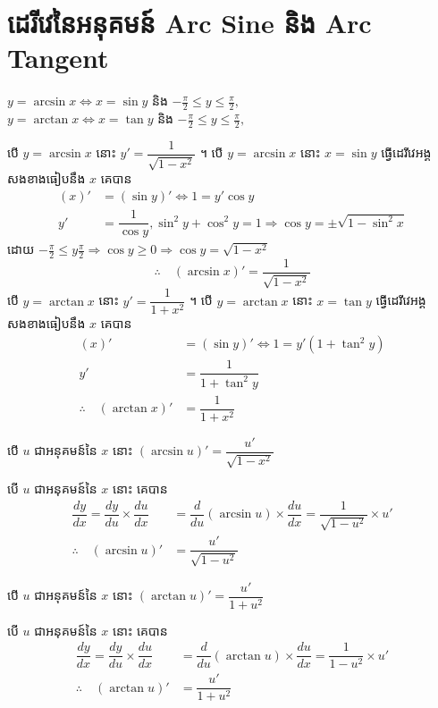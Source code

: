 \documentclass[a4paper,12pt]{article}
\begin{document}
\section{ដេរីវេនៃអនុគមន៍ Arc Sine និង Arc  Tangent}
\begin{center}
	$y=\arcsin x\Longleftrightarrow x=\sin y$ និង $-\frac{\pi}{2}\leq y \leq \frac{\pi}{2},$\\
	$y=\arctan x \Longleftrightarrow x=\tan y$ និង $-\frac{\pi}{2}\leq y \leq \frac{\pi}{2},$
\end{center}
បើ $y=\arcsin x $ នោះ $ y'=\dfrac{1}{\sqrt{1-x^2}}$ ។
\solution
បើ $y=\arcsin x$ នោះ $x=\sin y$ ធ្វើដេរីវេអង្គសងខាងធៀបនឹង $x$ គេបាន
\begin{align*}
	(x)' & =(\sin y)'\Longleftrightarrow 1=y' \cos y                                           \\
	y'   & =\dfrac{1}{\cos y} , \sin^2 y+\cos^2 y=1\Longrightarrow \cos y=\pm\sqrt{1-\sin^2 x}
\end{align*}
ដោយ $-\frac{\pi}{2}\leq y \frac{\pi}{2}\Longrightarrow\cos y\geq 0 \Longrightarrow \cos y=\sqrt{1-x^2}$
$$\therefore \quad (\arcsin x)'=\dfrac{1}{\sqrt{1-x^2}}$$
បើ $y=\arctan x $ នោះ $ y'=\dfrac{1}{1+x^2} $ ។
\solution
បើ $y=\arctan x$ នោះ $x=\tan y$ ធ្វើដេរីវេអង្គសងខាងធៀបនឹង $x$ គេបាន
\begin{align*}
	(x)'                          & =(\sin y)'\Longleftrightarrow 1=y'(1+\tan^2 y ) \\
	y'                            & =\dfrac{1}{1+\tan^2 y}                          \\
	\therefore \quad (\arctan x)' & =\dfrac{1}{1+x^2}
\end{align*}
\begin{general}
	បើ $u$ ជាអនុគមន៍នៃ $x$ នោះ $(\arcsin u)'=\dfrac{u'}{\sqrt{1-x^2}}$
\end{general}
\solution
បើ $u$ ជាអនុគមន៍នៃ $x$ នោះ  គេបាន
\begin{align*}
	\dfrac{dy}{dx}=\dfrac{dy}{du}\times \dfrac{du}{dx} & =\dfrac{d}{du}(\arcsin u)\times \dfrac{du}{dx}=\dfrac{1}{\sqrt{1-u^2}}\times u' \\
	\therefore \quad (\arcsin u)'                      & =\dfrac{u'}{\sqrt{1-u^2}}
\end{align*}
\begin{general}
	បើ $u$ ជាអនុគមន៍នៃ $x$ នោះ $(\arctan u)'=\dfrac{u'}{1+u^2}$
\end{general}
\solution
បើ $u$ ជាអនុគមន៍នៃ $x$ នោះ  គេបាន
\begin{align*}
	\dfrac{dy}{dx}=\dfrac{dy}{du}\times \dfrac{du}{dx} & =\dfrac{d}{du}(\arctan u)\times \dfrac{du}{dx}=\dfrac{1}{1-u^2}\times u' \\
	\therefore \quad (\arctan u)'                      & =\dfrac{u'}{1+u^2}
\end{align*}
\end{document}
